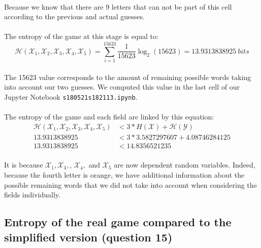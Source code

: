 \documentclass[a4paper, 11pt, oneside]{article}
\begin{document}
\paragraph{}Because we know that there are 9 letters that can not be part of this cell according to the previous and actual guesses.

\paragraph{}The entropy of the game at this stage is equal to:
$$\mathcal{H}(\mathcal{X}_1, \mathcal{X}_2, \mathcal{X}_3, \mathcal{X}_4,\mathcal{X}_5) = \sum_{i=1}^{15623} \frac{1}{15623} \log_2{(15623)} = 13.9313838925 \ bits$$
\paragraph{}The 15623 value corresponds to the amount of remaining possible words taking into account our two guesses. We computed this value in the last cell of our Jupyter Notebook \texttt{s180521s182113.ipynb}.

\paragraph{}The entropy of the game and each field are linked by this equation:
\begin{align*}
    \mathcal{H}(\mathcal{X}_1, \mathcal{X}_2, \mathcal{X}_3, \mathcal{X}_4,\mathcal{X}_5) &< 3 * {H}(\mathcal{X}) + \mathcal{H}(\mathcal{Y}) \\
                                                                            13.9313838925 &< 3 * 3.5827297607 + 4.08746284125 \\
                                                                            13.9313838925 &< 14.8356521235
\end{align*}
\paragraph{}It is because $\mathcal{X}_1, \mathcal{X}_3,$, $\mathcal{X}_4,$ and $\mathcal{X}_5$ are now dependent random variables. Indeed, because the fourth letter is orange, we have additional information about the possible remaining words that we did not take into account when considering the fields individually.

\subsection{Entropy of the real game compared to the simplified version (question 15)}
\end{document}
